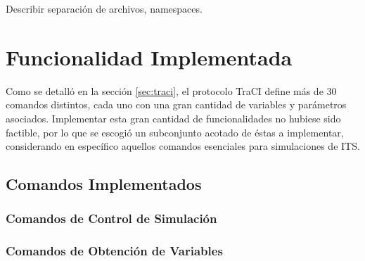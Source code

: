 Describir separación de archivos, namespaces.

\section{Funcionalidad Implementada}

Como se detalló en la sección \ref{sec:traci}, el protocolo TraCI define más de 30 comandos distintos, cada uno con una gran cantidad de variables y parámetros asociados. Implementar esta gran cantidad de funcionalidades no hubiese sido factible, por lo que se escogió un subconjunto acotado de éstas a implementar, considerando en específico aquellos comandos esenciales para simulaciones de ITS.

\subsection{Comandos Implementados} \label{sec:comandos}

\subsubsection{Comandos de Control de Simulación}

\begin{itemize}
    \begin{multicols}{2}
    \end{multicols}
\end{itemize}

\subsubsection{Comandos de Obtención de Variables}

